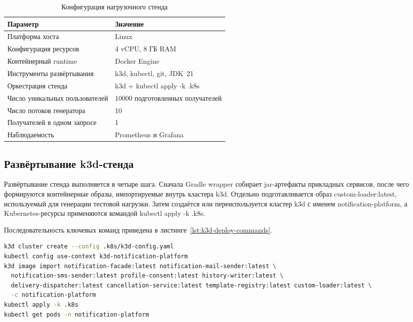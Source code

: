 \begin{table}[H]
    \centering
    \footnotesize
    \renewcommand{\arraystretch}{1.15}
    \caption{Конфигурация нагрузочного стенда}
    \label{tab:load-stand-config}
    \begin{tabular}{|L{0.34\textwidth}|L{0.50\textwidth}|}
        \hline
        \textbf{Параметр} & \textbf{Значение} \\
        \hline
        Платформа хоста & Linux \\
        \hline
        Конфигурация ресурсов & 4 vCPU, 8 ГБ RAM \\
        \hline
        Контейнерный runtime & Docker Engine \\
        \hline
        Инструменты развёртывания & k3d, kubectl, git, JDK~21 \\
        \hline
        Оркестрация стенда & k3d + kubectl apply -k .k8s \\
        \hline
        Число уникальных пользователей & 10000 подготовленных получателей \\
        \hline
        Число потоков генератора & 10 \\
        \hline
        Получателей в одном запросе & 1 \\
        \hline
        Наблюдаемость & Prometheus и Grafana \\
        \hline
    \end{tabular}
\end{table}

\subsection{Развёртывание k3d-стенда}

Развёртывание стенда выполняется в четыре шага. Сначала Gradle wrapper собирает jar-артефакты прикладных сервисов, после чего формируются контейнерные образы, импортируемые внутрь кластера k3d. Отдельно подготавливается образ custom-loader:latest, используемый для генерации тестовой нагрузки. Затем создаётся или переиспользуется кластер k3d с именем notification-platform, а Kubernetes-ресурсы применяются командой kubectl apply -k .k8s.

Последовательность ключевых команд приведена в листинге~\ref{lst:k3d-deploy-commands}.
\begin{lstlisting}[language=bash,caption={Последовательность ключевых команд развёртывания k3d-стенда},label={lst:k3d-deploy-commands}]
k3d cluster create --config .k8s/k3d-config.yaml
kubectl config use-context k3d-notification-platform
k3d image import notification-facade:latest notification-mail-sender:latest \
  notification-sms-sender:latest profile-consent:latest history-writer:latest \
  delivery-dispatcher:latest cancellation-service:latest template-registry:latest custom-loader:latest \
  -c notification-platform
kubectl apply -k .k8s
kubectl get pods -n notification-platform
\end{lstlisting}

